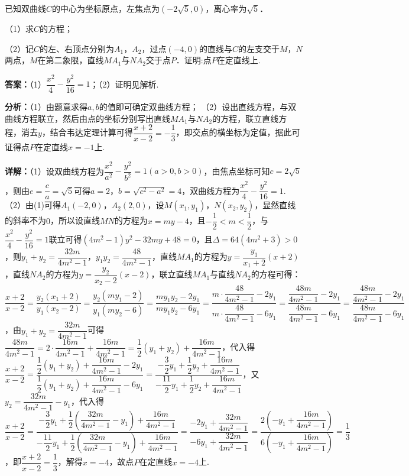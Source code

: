 \begin{question}[points=10]
已知双曲线$C$的中心为坐标原点，左焦点为$(-2\sqrt{5},0)$，离心率为$\sqrt{5}$．

（1）求$C$的方程；

（2）记$C$的左、右顶点分别为$A_{1}$，$A_{2}$，过点$(-4,0)$的直线与$C$的左支交于$M$，$N$两点，$M$在第二象限，直线$MA_{1}$与$NA_{2}$交于点$P$．证明:点$P$在定直线上.
\begin{solution}
\textbf{答案：}（1）$\dfrac{x^{2}}{4}-\dfrac{y^{2}}{16}=1$；（2）证明见解析.

\textbf{分析：}（1）由题意求得$a,b$的值即可确定双曲线方程；
（2）设出直线方程，与双曲线方程联立，然后由点的坐标分别写出直线$MA_{1}$与$NA_{2}$的方程，联立直线方程，消去$y$，结合韦达定理计算可得$\dfrac{x+2}{x-2}=-\dfrac{1}{3}$，即交点的横坐标为定值，据此可证得点$P$在定直线$x=-1$上.

\textbf{详解：}（1）设双曲线方程为$\dfrac{x^{2}}{a^{2}}-\dfrac{y^{2}}{b^{2}}=1(a>0,b>0)$，由焦点坐标可知$c=2\sqrt{5}$，则由$e=\dfrac{c}{a}=\sqrt{5}$可得$a=2$，$b=\sqrt{c^{2}-a^{2}}=4$，双曲线方程为$\dfrac{x^{2}}{4}-\dfrac{y^{2}}{16}=1$.
（2）由(1)可得$A_{1}(-2,0)$，$A_{2}(2,0)$，设$M(x_{1},y_{1})$，$N(x_{2},y_{2})$，显然直线的斜率不为$0$，所以设直线$MN$的方程为$x=my-4$，且$-\dfrac{1}{2}<m<\dfrac{1}{2}$，与$\dfrac{x^{2}}{4}-\dfrac{y^{2}}{16}=1$联立可得$(4m^{2}-1)y^{2}-32my+48=0$，且$\Delta=64(4m^{2}+3)>0$，则$y_{1}+y_{2}=\dfrac{32m}{4m^{2}-1}$，$y_{1}y_{2}=\dfrac{48}{4m^{2}-1}$，直线$MA_{1}$的方程为$y=\dfrac{y_{1}}{x_{1}+2}(x+2)$，直线$NA_{2}$的方程为$y=\dfrac{y_{2}}{x_{2}-2}(x-2)$，联立直线$MA_{1}$与直线$NA_{2}$的方程可得：$\dfrac{x+2}{x-2}=\dfrac{y_{2}(x_{1}+2)}{y_{1}(x_{2}-2)}=\dfrac{y_{2}(my_{1}-2)}{y_{1}(my_{2}-6)}=\dfrac{my_{1}y_{2}-2y_{1}}{my_{1}y_{2}-6y_{1}}=\dfrac{m\cdot\dfrac{48}{4m^{2}-1}-2y_{1}}{m\cdot\dfrac{48}{4m^{2}-1}-6y_{1}}=\dfrac{\dfrac{48m}{4m^{2}-1}-2y_{1}}{\dfrac{48m}{4m^{2}-1}-6y_{1}}=\dfrac{\dfrac{48m}{4m^{2}-1}-2y_{1}}{\dfrac{48m}{4m^{2}-1}-6y_{1}}$，由$y_{1}+y_{2}=\dfrac{32m}{4m^{2}-1}$可得$\dfrac{48m}{4m^{2}-1}=2\cdot\dfrac{16m}{4m^{2}-1}+\dfrac{16m}{4m^{2}-1}=\dfrac{1}{2}(y_{1}+y_{2})+\dfrac{16m}{4m^{2}-1}$，代入得$\dfrac{x+2}{x-2}=\dfrac{\dfrac{1}{2}(y_{1}+y_{2})+\dfrac{16m}{4m^{2}-1}-2y_{1}}{\dfrac{1}{2}(y_{1}+y_{2})+\dfrac{16m}{4m^{2}-1}-6y_{1}}=\dfrac{-\dfrac{3}{2}y_{1}+\dfrac{1}{2}y_{2}+\dfrac{16m}{4m^{2}-1}}{-\dfrac{11}{2}y_{1}+\dfrac{1}{2}y_{2}+\dfrac{16m}{4m^{2}-1}}$，又$y_{2}=\dfrac{32m}{4m^{2}-1}-y_{1}$，代入得$\dfrac{x+2}{x-2}=\dfrac{-\dfrac{3}{2}y_{1}+\dfrac{1}{2}(\dfrac{32m}{4m^{2}-1}-y_{1})+\dfrac{16m}{4m^{2}-1}}{-\dfrac{11}{2}y_{1}+\dfrac{1}{2}(\dfrac{32m}{4m^{2}-1}-y_{1})+\dfrac{16m}{4m^{2}-1}}=\dfrac{-2y_{1}+\dfrac{32m}{4m^{2}-1}}{-6y_{1}+\dfrac{32m}{4m^{2}-1}}=\dfrac{2(-y_{1}+\dfrac{16m}{4m^{2}-1})}{6(-y_{1}+\dfrac{16m}{4m^{2}-1})}=\dfrac{1}{3}$，即$\dfrac{x+2}{x-2}=\dfrac{1}{3}$，解得$x=-4$，故点$P$在定直线$x=-4$上.
\end{solution}
\end{question}

